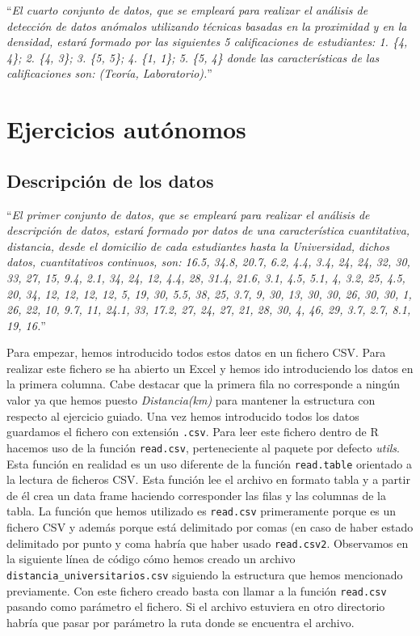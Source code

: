 \documentclass[12pt]{report}\usepackage[]{graphicx}\usepackage[dvipsnames]{xcolor}
\begin{document}
				``\textit{El cuarto conjunto de datos, que se empleará para realizar el análisis de detección de datos anómalos utilizando técnicas basadas en la proximidad y en la densidad, estará formado por las siguientes 5 calificaciones de estudiantes: 1. \{4, 4\}; 2. \{4, 3\}; 3. \{5, 5\}; 4. \{1, 1\}; 5. \{5, 4\} donde las características de las calificaciones son: (Teoría, Laboratorio).}''
	
	\chapter{Ejercicios autónomos}
	
		\section{Descripción de los datos}
		
			``\textit{El primer conjunto de datos, que se empleará para realizar el análisis de descripción de datos, estará formado por datos de una característica cuantitativa, distancia, desde el domicilio de cada estudiantes hasta la Universidad, dichos datos, cuantitativos continuos, son: 16.5, 34.8, 20.7, 6.2, 4.4, 3.4, 24, 24, 32, 30, 33, 27, 15, 9.4, 2.1, 34, 24, 12, 4.4, 28, 31.4, 21.6, 3.1, 4.5, 5.1, 4, 3.2, 25, 4.5, 20, 34, 12, 12, 12, 12, 5, 19, 30, 5.5, 38, 25, 3.7, 9, 30, 13, 30, 30, 26, 30, 30, 1, 26, 22, 10, 9.7, 11, 24.1, 33, 17.2, 27, 24, 27, 21, 28, 30, 4, 46, 29, 3.7, 2.7, 8.1, 19, 16.}''
			
			Para empezar, hemos introducido todos estos datos en un fichero CSV. Para realizar este fichero se ha abierto un Excel y hemos ido introduciendo los datos en la primera columna. Cabe destacar que la primera fila no corresponde a ningún valor ya que hemos puesto \textit{Distancia(km)} para mantener la estructura con respecto al ejercicio guiado. Una vez hemos introducido todos los datos guardamos el fichero con extensión \texttt{.csv}. Para leer este fichero dentro de R hacemos uso de la función \texttt{read.csv}, perteneciente al paquete por defecto \textit{utils}. Esta función en realidad es un uso diferente de la función \texttt{read.table} orientado a la lectura de ficheros CSV. Esta función lee el archivo en formato tabla y a partir de él crea un data frame haciendo corresponder las filas y las columnas de la tabla. La función que hemos utilizado es \texttt{read.csv} primeramente porque es un fichero CSV y además porque está delimitado por comas (en caso de haber estado delimitado por punto y coma habría que haber usado \texttt{read.csv2}. Observamos en la siguiente línea de código cómo hemos creado un archivo \texttt{distancia\_universitarios.csv} siguiendo la estructura que hemos mencionado previamente. Con este fichero creado basta con llamar a la función \texttt{read.csv} pasando como parámetro el fichero. Si el archivo estuviera en otro directorio habría que pasar por parámetro la ruta donde se encuentra el archivo.
			
\end{document}
